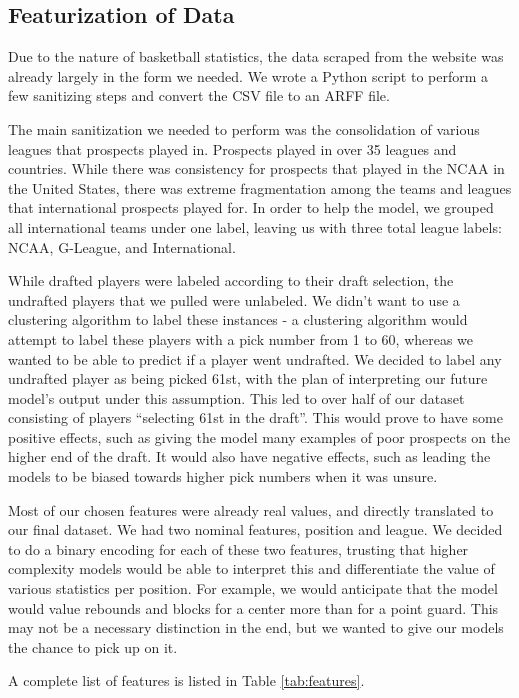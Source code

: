 \documentclass{article}
\begin{document}
\subsection{Featurization of Data}

Due to the nature of basketball statistics, the data scraped from the website
was already largely in the form we needed. We wrote a Python script to perform a
few sanitizing steps and convert the CSV file to an ARFF file.

The main sanitization we needed to perform was the consolidation of various
leagues that prospects played in. Prospects played in over 35 leagues and
countries. While there was consistency for prospects that played in the NCAA in
the United States, there was extreme fragmentation among the teams and leagues
that international prospects played for. In order to help the model, we grouped
all international teams under one label, leaving us with three total league
labels: NCAA, G-League, and International.

While drafted players were labeled according to their draft selection, the
undrafted players that we pulled were unlabeled. We didn’t want to use a
clustering algorithm to label these instances - a clustering algorithm would
attempt to label these players with a pick number from 1 to 60, whereas we
wanted to be able to predict if a player went undrafted. We decided to label any
undrafted player as being picked 61st, with the plan of interpreting our future
model’s output under this assumption. This led to over half of our dataset
consisting of players “selecting 61st in the draft”. This would prove to have
some positive effects, such as giving the model many examples of poor prospects
on the higher end of the draft. It would also have negative effects, such as
leading the models to be biased towards higher pick numbers when it was unsure. 

Most of our chosen features were already real values, and directly translated to
our final dataset. We had two nominal features, position and league. We decided
to do a binary encoding for each of these two features, trusting that higher
complexity models would be able to interpret this and differentiate the value of
various statistics per position. For example, we would anticipate that the model
would value rebounds and blocks for a center more than for a point guard. This
may not be a necessary distinction in the end, but we wanted to give our models
the chance to pick up on it.

A complete list of features is listed in Table \ref{tab:features}.
\end{document}
